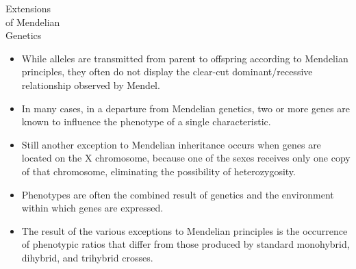 \clearpage
\thispagestyle{empty}



\@specialfalse
{}

\begin{specialchapter}[
     image=genetics-dogs,
     image caption={Labrador retriever\\
         puppies expressing\\
         brown (chocolate),\\
         golden (yellow),\\
         and black\\
         coat colors,\\
         traits controlled\\
         by two gene pairs.}]%
{Extensions\\ of Mendelian\\ Genetics}
\begin{itemize}
\item While alleles are transmitted from parent to   offspring
according to Mendelian principles, they often do not
display the clear-cut dominant/recessive relationship
observed by Mendel.
\item In many cases, in a departure from Mendelian genetics,
two or more genes are known to influence the phenotype
of a single characteristic.
\item Still another exception to Mendelian inheritance occurs
when genes are located on the X chromosome, because one
of the sexes receives only one copy of that chromosome,
eliminating the possibility of heterozygosity.
\item Phenotypes are often the combined result of genetics and
the environment within which genes are expressed.
\item The result of the various exceptions to Mendelian principles
is the occurrence of phenotypic ratios that differ from those
produced by standard monohybrid, dihybrid, and trihybrid
crosses.
  \end{itemize}
\end{specialchapter}


